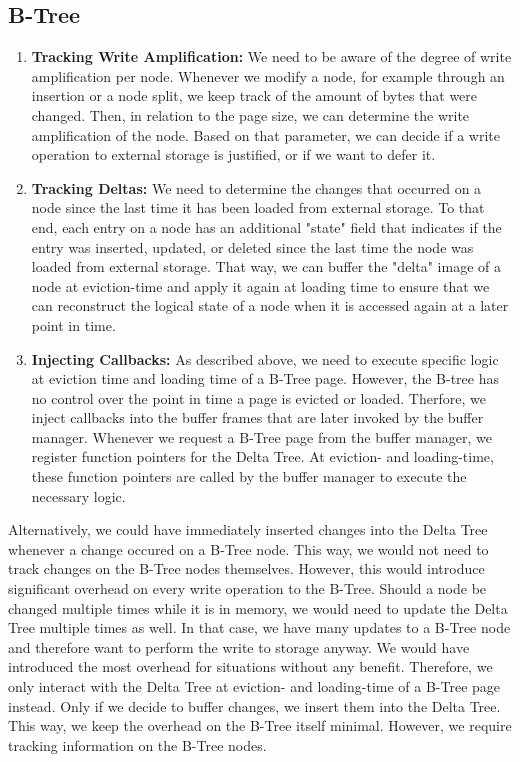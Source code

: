 \subsection*{B-Tree}
\begin{enumerate}
  \item \textbf{Tracking Write Amplification:}
We need to be aware of the degree of write amplification per node. 
Whenever we modify a node, for example through an insertion or a node split, we keep track of the amount of bytes that were changed.
Then, in relation to the page size, we can determine the write amplification of the node.
Based on that parameter, we can decide if a write operation to external storage is justified, or if we want to defer it.
  \item \textbf{Tracking Deltas:} 
We need to determine the changes that occurred on a node since the last time it has been loaded from external storage.
To that end, each entry on a node has an additional "state" field that indicates if the entry was inserted, updated, or deleted since the last time the node was loaded from external storage.
That way, we can buffer the "delta" image of a node at eviction-time and apply it again at loading time to ensure that we can reconstruct the logical state of a node when it is accessed again at a later point in time.
\item \textbf{Injecting Callbacks:}
As described above, we need to execute specific logic at eviction time and loading time of a B-Tree page.
However, the B-tree has no control over the point in time a page is evicted or loaded.
Therfore, we inject callbacks into the buffer frames that are later invoked by the buffer manager.
Whenever we request a B-Tree page from the buffer manager, we register function pointers for the Delta Tree.
At eviction- and loading-time, these function pointers are called by the buffer manager to execute the necessary logic.
\end{enumerate}

Alternatively, we could have immediately inserted changes into the Delta Tree whenever a change occured on a B-Tree node.
This way, we would not need to track changes on the B-Tree nodes themselves.
However, this would introduce significant overhead on every write operation to the B-Tree.
Should a node be changed multiple times while it is in memory, we would need to update the Delta Tree multiple times as well.
In that case, we have many updates to a B-Tree node and therefore want to perform the write to storage anyway.
We would have introduced the most overhead for situations without any benefit.
Therefore, we only interact with the Delta Tree at eviction- and loading-time of a B-Tree page instead.
Only if we decide to buffer changes, we insert them into the Delta Tree.
This way, we keep the overhead on the B-Tree itself minimal.
However, we require tracking information on the B-Tree nodes.


